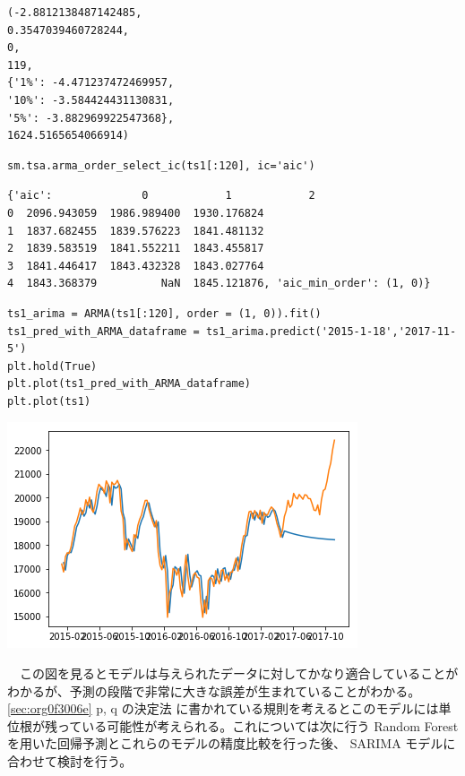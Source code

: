 \documentclass{scrartcl}
\begin{document}
\begin{verbatim}
(-2.8812138487142485,
0.3547039460728244,
0,
119,
{'1%': -4.471237472469957,
'10%': -3.584424431130831,
'5%': -3.882969922547368},
1624.5165654066914)
\end{verbatim}

\begin{verbatim}
sm.tsa.arma_order_select_ic(ts1[:120], ic='aic')
\end{verbatim}

\begin{verbatim}
{'aic':              0            1            2
0  2096.943059  1986.989400  1930.176824
1  1837.682455  1839.576223  1841.481132
2  1839.583519  1841.552211  1843.455817
3  1841.446417  1843.432328  1843.027764
4  1843.368379          NaN  1845.121876, 'aic_min_order': (1, 0)}
\end{verbatim}

\begin{verbatim}
ts1_arima = ARMA(ts1[:120], order = (1, 0)).fit()
ts1_pred_with_ARMA_dataframe = ts1_arima.predict('2015-1-18','2017-11-5')
plt.hold(True)
plt.plot(ts1_pred_with_ARMA_dataframe)
plt.plot(ts1)
\end{verbatim}

\begin{center}
\includegraphics[width=.9\linewidth]{./obipy-resources/cAoUWN.png}
\end{center}

　この図を見るとモデルは与えられたデータに対してかなり適合していることがわかるが、予測の段階で非常に大きな誤差が生まれていることがわかる。 \ref{sec:org0f3006e} p, q の決定法 に書かれている規則を考えるとこのモデルには単位根が残っている可能性が考えられる。これについては次に行う Random Forest を用いた回帰予測とこれらのモデルの精度比較を行った後、 SARIMA モデルに合わせて検討を行う。\\
\end{document}

